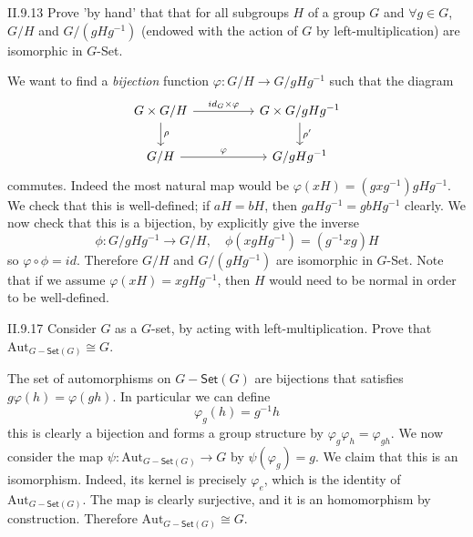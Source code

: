 \begin{problem}{II.9.13}
Prove 'by hand' that that for all subgroups $H$ of a group $G$ and $\forall g \in G$, $G/H$ and $G/(gHg^{-1})$ (endowed with the action of $G$ by left-multiplication) are isomorphic in $G$-\textsf{Set}.
\end{problem}
\begin{pf}
We want to find a \emph{bijection} function $\varphi : G/H \to G/gHg^{-1}$ such that the diagram
\[
\begin{tikzcd}
G\times G/H \arrow[rr, "id_G \times \varphi"] \arrow[d, "\rho"] &  & G \times G/gHg^{-1} \arrow[d, "\rho'"] \\
G/H \arrow[rr, "\varphi"]                                       &  & G/gHg^{-1}                            
\end{tikzcd}
\]
commutes. Indeed the most natural map would be $\varphi(xH) = (gxg^{-1})gHg^{-1}$. We check that this is well-defined; if $aH = bH$, then $gaHg^{-1} = gbHg^{-1}$ clearly.
We now check that this is a bijection, by explicitly give the inverse
\[
\phi : G/gHg^{-1} \to G/H, \quad \phi(xgHg^{-1}) = (g^{-1}xg)H
\]
so $\varphi \circ \phi = id$. Therefore $G/H$ and $G/(gHg^{-1})$ are isomorphic in $G$-\textsf{Set}. Note that if we assume $\varphi(xH) = xgHg^{-1}$, then $H$ would need to be normal in order to be well-defined.
\end{pf}



\begin{problem}{II.9.17}
Consider $G$ as a $G$-set, by acting with left-multiplication. Prove that \\ $\text{Aut}_{G-\textsf{Set}(G)}\cong G$.
\end{problem}
\begin{pf}
The set of automorphisms on $G-\textsf{Set}(G)$ are bijections that satisfies $g\varphi(h) = \varphi(gh)$. In particular we can define
\[
\varphi_g(h) = g^{-1}h
\]
this is clearly a bijection and forms a group structure by $\varphi_g \varphi_h = \varphi_{gh}$. We now consider the map $\psi : \text{Aut}_{G-\textsf{Set}(G)} \to G$ by $\psi(\varphi_g) = g$. We claim that this is an isomorphism. Indeed, its kernel is precisely $\varphi_e$, which is the identity of $\text{Aut}_{G-\textsf{Set}(G)}$. The map is clearly surjective, and it is an homomorphism by construction. Therefore $\text{Aut}_{G-\textsf{Set}(G)}\cong G$.
\end{pf}